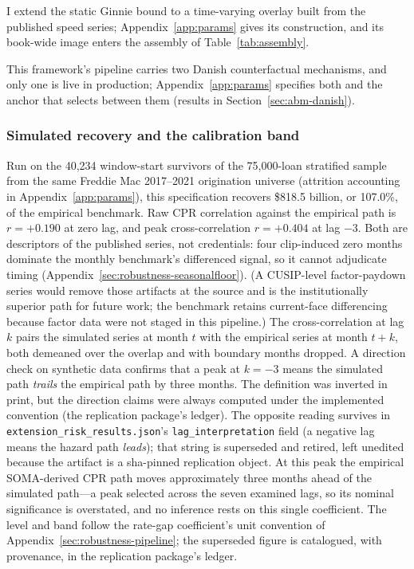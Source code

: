 \documentclass[12pt]{article}
\begin{document}
I extend the static Ginnie bound to a time-varying overlay built from the published speed series; Appendix~\ref{app:params} gives its construction, and its book-wide image enters the assembly of Table~\ref{tab:assembly}.

This framework's pipeline carries two Danish counterfactual mechanisms, and only one is live in production; Appendix~\ref{app:params} specifies both and the anchor that selects between them (results in Section~\ref{sec:abm-danish}).

\subsubsection{Simulated recovery and the calibration band}

Run on the 40,234 window-start survivors of the 75,000-loan stratified sample from the same Freddie Mac 2017--2021 origination universe (attrition accounting in Appendix~\ref{app:params}), this specification recovers \$818.5 billion, or 107.0\%, of the empirical benchmark. Raw CPR correlation against the empirical path is $r = +0.190$ at zero lag, and peak cross-correlation $r = +0.404$ at lag $-3$. Both are descriptors of the published series, not credentials: four clip-induced zero months dominate the monthly benchmark's differenced signal, so it cannot adjudicate timing (Appendix~\ref{sec:robustness-seasonalfloor}). (A CUSIP-level factor-paydown series would remove those artifacts at the source and is the institutionally superior path for future work; the benchmark retains current-face differencing because factor data were not staged in this pipeline.) The cross-correlation at lag $k$ pairs the simulated series at month $t$ with the empirical series at month $t+k$, both demeaned over the overlap and with boundary months dropped. A direction check on synthetic data confirms that a peak at $k=-3$ means the simulated path \emph{trails} the empirical path by three months. The definition was inverted in print, but the direction claims were always computed under the implemented convention (the replication package's ledger). The opposite reading survives in \texttt{extension\_risk\_results.json}'s \texttt{lag\_interpretation} field (a negative lag means the hazard path \emph{leads}); that string is superseded and retired, left unedited because the artifact is a sha-pinned replication object. At this peak the empirical SOMA-derived CPR path moves approximately three months ahead of the simulated path---a peak selected across the seven examined lags, so its nominal significance is overstated, and no inference rests on this single coefficient. The level and band follow the rate-gap coefficient's unit convention of Appendix~\ref{sec:robustness-pipeline}; the superseded figure is catalogued, with provenance, in the replication package's ledger.
\end{document}
